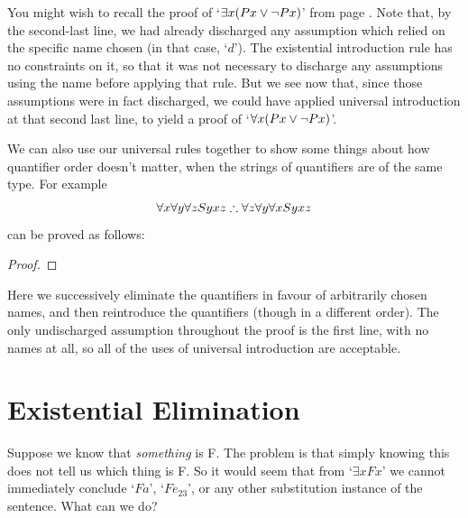 You might wish to recall the proof of `$\exists x (Px \vee \neg Px)$' from page \pageref{exexmid}. Note that, by the second-last line, we had already discharged any assumption which relied on the specific name chosen (in that case, `$d$'). The existential introduction rule has no constraints on it, so that it was not necessary to discharge any assumptions using the name before applying that rule. But we see now that, since those assumptions were in fact discharged, we could have applied universal introduction at that second last line, to yield a proof of `$\forall x (Px \vee \neg Px)$'.

We can also use our universal rules together to show some things about how quantifier order doesn't matter, when the strings of quantifiers are of the same type. For example $$\forall x \forall y \forall z Syxz \mathrel{\therefore} \forall z \forall y \forall x Syxz$$ can be proved as follows: \begin{proof}
\end{proof} Here we successively eliminate the quantifiers in favour of arbitrarily chosen names, and then reintroduce the quantifiers (though in a different order). The only undischarged assumption throughout the proof is the first line, with no names at all, so all of the uses of universal introduction are acceptable.


\section{Existential Elimination}\label{exelim}
Suppose we know that \emph{something} is F. The problem is that simply knowing this does not tell us which thing is F. So it would seem that from `$\exists x Fx$' we cannot immediately conclude `$Fa$', `$Fe_{23}$', or any other substitution instance of the sentence. What can we do?

